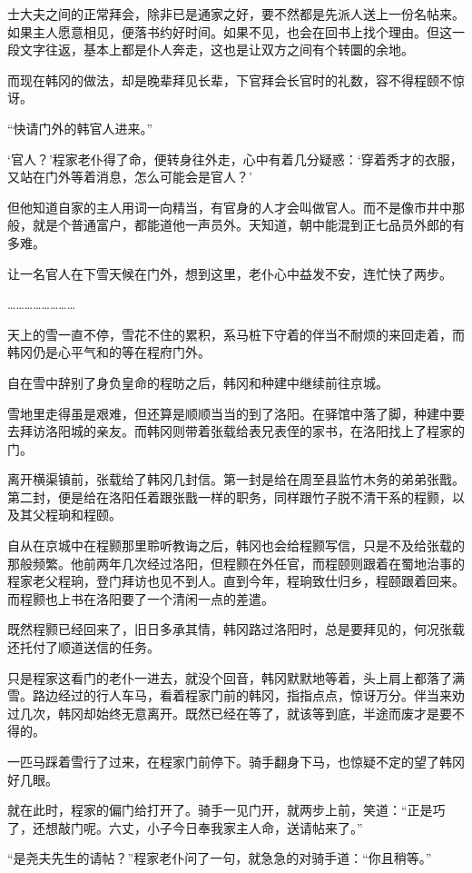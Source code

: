 士大夫之间的正常拜会，除非已是通家之好，要不然都是先派人送上一份名帖来。如果主人愿意相见，便落书约好时间。如果不见，也会在回书上找个理由。但这一段文字往返，基本上都是仆人奔走，这也是让双方之间有个转圜的余地。

而现在韩冈的做法，却是晚辈拜见长辈，下官拜会长官时的礼数，容不得程颐不惊讶。

“快请门外的韩官人进来。”

‘官人？’程家老仆得了命，便转身往外走，心中有着几分疑惑：‘穿着秀才的衣服，又站在门外等着消息，怎么可能会是官人？’

但他知道自家的主人用词一向精当，有官身的人才会叫做官人。而不是像市井中那般，就是个普通富户，都能道他一声员外。天知道，朝中能混到正七品员外郎的有多难。

让一名官人在下雪天候在门外，想到这里，老仆心中益发不安，连忙快了两步。

……………………

天上的雪一直不停，雪花不住的累积，系马桩下守着的伴当不耐烦的来回走着，而韩冈仍是心平气和的等在程府门外。

自在雪中辞别了身负皇命的程昉之后，韩冈和种建中继续前往京城。

雪地里走得虽是艰难，但还算是顺顺当当的到了洛阳。在驿馆中落了脚，种建中要去拜访洛阳城的亲友。而韩冈则带着张载给表兄表侄的家书，在洛阳找上了程家的门。

离开横渠镇前，张载给了韩冈几封信。第一封是给在周至县监竹木务的弟弟张戬。第二封，便是给在洛阳任着跟张戬一样的职务，同样跟竹子脱不清干系的程颢，以及其父程珦和程颐。

自从在京城中在程颢那里聆听教诲之后，韩冈也会给程颢写信，只是不及给张载的那般频繁。他前两年几次经过洛阳，但程颢在外任官，而程颐则跟着在蜀地治事的程家老父程珦，登门拜访也见不到人。直到今年，程珦致仕归乡，程颐跟着回来。而程颢也上书在洛阳要了一个清闲一点的差遣。

既然程颢已经回来了，旧日多承其情，韩冈路过洛阳时，总是要拜见的，何况张载还托付了顺道送信的任务。

只是程家这看门的老仆一进去，就没个回音，韩冈默默地等着，头上肩上都落了满雪。路边经过的行人车马，看着程家门前的韩冈，指指点点，惊讶万分。伴当来劝过几次，韩冈却始终无意离开。既然已经在等了，就该等到底，半途而废才是要不得的。

一匹马踩着雪行了过来，在程家门前停下。骑手翻身下马，也惊疑不定的望了韩冈好几眼。

就在此时，程家的偏门给打开了。骑手一见门开，就两步上前，笑道：“正是巧了，还想敲门呢。六丈，小子今日奉我家主人命，送请帖来了。”

“是尧夫先生的请帖？”程家老仆问了一句，就急急的对骑手道：“你且稍等。”

